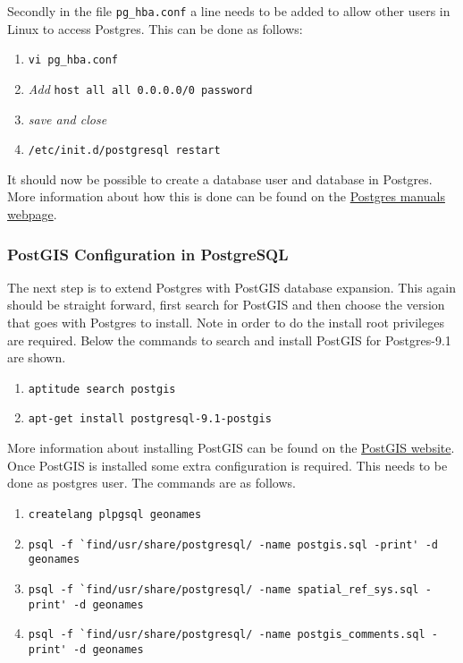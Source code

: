 Secondly in the file \lstinline|pg_hba.conf| a line needs to be added to allow other users in Linux to access Postgres. This can be done as follows:

\begin{enumerate}[resume]
	\item \lstinline|vi pg_hba.conf|
	\item \textit{Add} \lstinline|host all all 0.0.0.0/0 password|
	\item \textit{save and close}
	\item \lstinline|/etc/init.d/postgresql restart|
\end{enumerate}

\noindent It should now be possible to create a database user and database in Postgres. More information about how this is done can be found on the \href{http://www.postgresql.org/docs/manuals/}{Postgres manuals webpage}.

\subsubsection{PostGIS Configuration in PostgreSQL}
\label{sec:postgis}
The next step is to extend Postgres with PostGIS database expansion. This again should be straight forward, first search for PostGIS and then choose the version that goes with Postgres to install. Note in order to do the install root privileges are required. Below the commands to search and install PostGIS for Postgres-9.1 are shown.

\begin{enumerate}
	\item \lstinline|aptitude search postgis|
	\item \lstinline|apt-get install postgresql-9.1-postgis|
\end{enumerate} 

\noindent More information about installing PostGIS  can be found on the \href{http://www.postgis.net/install}{PostGIS website}.
\newline
\newline
Once PostGIS is installed some extra configuration is required. This needs to be done as postgres user. The commands are as follows.

\begin{enumerate}	
	\item \lstinline|createlang plpgsql geonames|
	\item \lstinline|psql -f `find/usr/share/postgresql/ -name postgis.sql -print' -d geonames|
	\item \lstinline|psql -f `find/usr/share/postgresql/ -name spatial_ref_sys.sql -print' -d geonames|
	\item \lstinline|psql -f `find/usr/share/postgresql/ -name postgis_comments.sql -print' -d geonames|
\end{enumerate}

